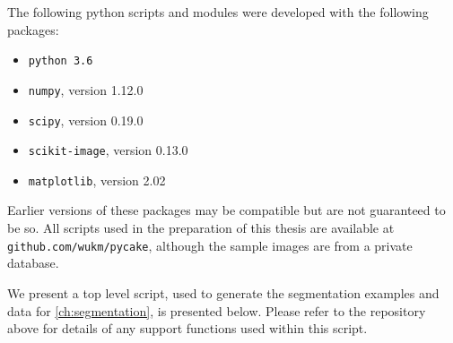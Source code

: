 The following python scripts and modules were developed with the following packages:

\begin{itemize}
\item \texttt{python 3.6}
\item \texttt{numpy}, version 1.12.0
\item \texttt{scipy}, version 0.19.0
\item \texttt{scikit-image}, version 0.13.0 
\item \texttt{matplotlib}, version 2.02
\end{itemize}
%
Earlier versions of these packages may be compatible but are not guaranteed to be so. 
All scripts used in the preparation of this thesis are available at
\texttt{github.com/wukm/pycake}, although the sample images are from a private database.

We present a top level script, used to generate the segmentation examples and data for \cref{ch:segmentation}, is presented below. Please refer to the repository above for details of any support functions used within this script.



